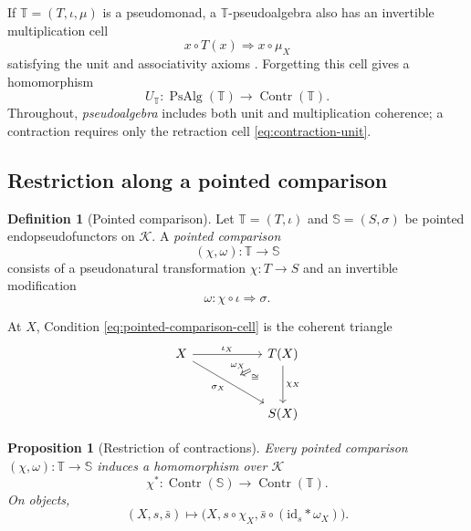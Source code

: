 \documentclass[11pt,a4paper]{article}
\numberwithin{equation}{section}
\newtheorem{proposition}[proposition]{Proposition}
\theoremstyle{definition}
\newtheorem{definition}[definition]{Definition}
\theoremstyle{remark}
\newcommand{\id}{\mathrm{id}}
\newcommand{\Kcat}{\mathcal K}
\newcommand{\Contr}{\operatorname{Contr}}
\newcommand{\PsAlg}{\operatorname{PsAlg}}
\begin{document}
If $\mathbb T=(T,\iota,\mu)$ is a pseudomonad, a
$\mathbb T$-pseudoalgebra also has an invertible multiplication cell
\[
  x\circ T(x)\Longrightarrow x\circ\mu_X
\]
satisfying the unit and associativity axioms
\cite{Street1972,BlackwellKellyPower1989}. Forgetting this cell gives
a homomorphism
\begin{equation}
  U_{\mathbb T}\colon
  \PsAlg(\mathbb T)\longrightarrow\Contr(\mathbb T).
  \label{eq:forget-multiplication}
\end{equation}
Throughout, \emph{pseudoalgebra} includes both unit and
multiplication coherence; a contraction requires only the retraction
cell \eqref{eq:contraction-unit}.

\subsection{Restriction along a pointed comparison}

\begin{definition}[Pointed comparison]
\label{def:pointed-comparison}
Let $\mathbb T=(T,\iota)$ and $\mathbb S=(S,\sigma)$ be pointed
endopseudofunctors on $\Kcat$. A \emph{pointed comparison}
\[
  (\chi,\omega)\colon\mathbb T\longrightarrow\mathbb S
\]
consists of a pseudonatural transformation $\chi\colon T\to S$ and
an invertible modification
\begin{equation}
  \omega\colon\chi\circ\iota\Longrightarrow\sigma.
  \label{eq:pointed-comparison-cell}
\end{equation}
\end{definition}

At $X$, Condition \eqref{eq:pointed-comparison-cell} is the coherent
triangle
\begin{equation}
\begin{tikzcd}[column sep=5.5em,row sep=3.0em]
  X \ar[r,"\iota_X"] \ar[dr,"\sigma_X"',""{name=SIGMA}]
  & T(X) \ar[d,"\chi_X"]
  \\
  & S(X)
  \ar[Rightarrow,from=1-2,to=SIGMA,
      shorten <=1.0em,shorten >=0.5em,
      "\omega_X"',"\cong"]
\end{tikzcd}
\label{eq:pointed-triangle}
\end{equation}

\begin{proposition}[Restriction of contractions]
\label{prop:contraction-restriction}
Every pointed comparison
\mbox{$(\chi,\omega)\colon\mathbb T\to\mathbb S$} induces a homomorphism over $\Kcat$
\[
  \chi^*\colon
  \Contr(\mathbb S)\longrightarrow\Contr(\mathbb T).
\]
On objects,
\begin{equation}
  (X,s,\bar s)\longmapsto
  \bigl(X,s\circ\chi_X,
  \bar s\circ(\id_s\ast\omega_X)\bigr).
  \label{eq:contraction-restriction}
\end{equation}
\end{proposition}
\end{document}
